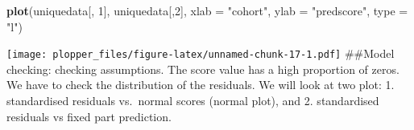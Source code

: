\documentclass[]{article}
\newenvironment{Shaded}{\begin{snugshade}}{\end{snugshade}}
\newcommand{\KeywordTok}[1]{\textcolor[rgb]{0.13,0.29,0.53}{\textbf{#1}}}
\newcommand{\DataTypeTok}[1]{\textcolor[rgb]{0.13,0.29,0.53}{#1}}
\newcommand{\DecValTok}[1]{\textcolor[rgb]{0.00,0.00,0.81}{#1}}
\newcommand{\StringTok}[1]{\textcolor[rgb]{0.31,0.60,0.02}{#1}}
\newcommand{\NormalTok}[1]{#1}
\begin{document}
\begin{Shaded}
\begin{Highlighting}[]
\KeywordTok{plot}\NormalTok{(uniquedata[, }\DecValTok{1}\NormalTok{], uniquedata[,}\DecValTok{2}\NormalTok{], }\DataTypeTok{xlab =} \StringTok{"cohort"}\NormalTok{, }\DataTypeTok{ylab =} \StringTok{"predscore"}\NormalTok{, }\DataTypeTok{type =} \StringTok{"l"}\NormalTok{)}
\end{Highlighting}
\end{Shaded}

\texttt{[image: plopper\_files/figure-latex/unnamed-chunk-17-1.pdf]}
\#\#Model checking: checking assumptions. The score value has a high
proportion of zeros. We have to check the distribution of the residuals.
We will look at two plot: 1. standardised residuals vs.~normal scores
(normal plot), and 2. standardised residuals vs fixed part prediction.
\end{document}
